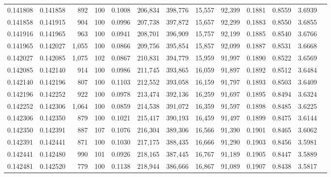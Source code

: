 \begin{tabular}{rrrrrrrrrrrrr}
0.141808 & 0.141858 &   892 & 100 &                                     0.1008 & 206,834 & 398,776 &  15,557 &  92,399 & 0.1881 & 0.8559 & 3.6939 \\
0.141858 & 0.141915 &   904 & 100 &                                     0.0996 & 207,738 & 397,872 &  15,657 &  92,299 & 0.1883 & 0.8550 & 3.6855 \\
0.141916 & 0.141965 &   963 & 100 &                                     0.0941 & 208,701 & 396,909 &  15,757 &  92,199 & 0.1885 & 0.8540 & 3.6766 \\
0.141965 & 0.142027 & 1,055 & 100 &                                     0.0866 & 209,756 & 395,854 &  15,857 &  92,099 & 0.1887 & 0.8531 & 3.6668 \\
0.142027 & 0.142085 & 1,075 & 102 &                                     0.0867 & 210,831 & 394,779 &  15,959 &  91,997 & 0.1890 & 0.8522 & 3.6569 \\
0.142085 & 0.142140 &   914 & 100 &                                     0.0986 & 211,745 & 393,865 &  16,059 &  91,897 & 0.1892 & 0.8512 & 3.6484 \\
0.142140 & 0.142196 &   807 & 100 &                                     0.1103 & 212,552 & 393,058 &  16,159 &  91,797 & 0.1893 & 0.8503 & 3.6409 \\
0.142196 & 0.142252 &   922 & 100 &                                     0.0978 & 213,474 & 392,136 &  16,259 &  91,697 & 0.1895 & 0.8494 & 3.6324 \\
0.142252 & 0.142306 & 1,064 & 100 &                                     0.0859 & 214,538 & 391,072 &  16,359 &  91,597 & 0.1898 & 0.8485 & 3.6225 \\
0.142306 & 0.142350 &   879 & 100 &                                     0.1021 & 215,417 & 390,193 &  16,459 &  91,497 & 0.1899 & 0.8475 & 3.6144 \\
0.142350 & 0.142391 &   887 & 107 &                                     0.1076 & 216,304 & 389,306 &  16,566 &  91,390 & 0.1901 & 0.8465 & 3.6062 \\
0.142391 & 0.142441 &   871 & 100 &                                     0.1030 & 217,175 & 388,435 &  16,666 &  91,290 & 0.1903 & 0.8456 & 3.5981 \\
0.142441 & 0.142480 &   990 & 101 &                                     0.0926 & 218,165 & 387,445 &  16,767 &  91,189 & 0.1905 & 0.8447 & 3.5889 \\
0.142481 & 0.142520 &   779 & 100 &                                     0.1138 & 218,944 & 386,666 &  16,867 &  91,089 & 0.1907 & 0.8438 & 3.5817 \\

\end{tabular}
